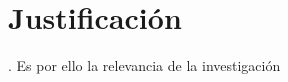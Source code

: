 	\chapter{Justificación}\label{Cap: Justificación}
		\lipsum[1].
		Es por ello la relevancia de la investigación \cite{Takayama-1985}
		